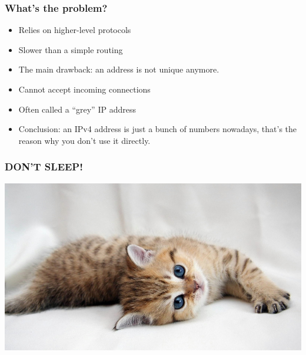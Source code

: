 \documentclass[12pt,leqno,fleqn]{beamer}
\begin{document}

\begin{frame}
\frametitle{What’s the problem?}
\begin{itemize}
\item Relies on higher-level protocols
\item Slower than a simple routing
\item The main drawback: an address is not unique anymore.
\item Cannot accept incoming connections
\item Often called a “grey” IP address
\item Conclusion: an IPv4 address is just a bunch of numbers nowadays, that’s the reason why you don’t use it directly.

\end{itemize}
\end{frame}


\begin{frame}
\frametitle{DON'T SLEEP!}
\includegraphics[scale=0.25]{kitty.jpg}
\end{frame}

\end{document}
